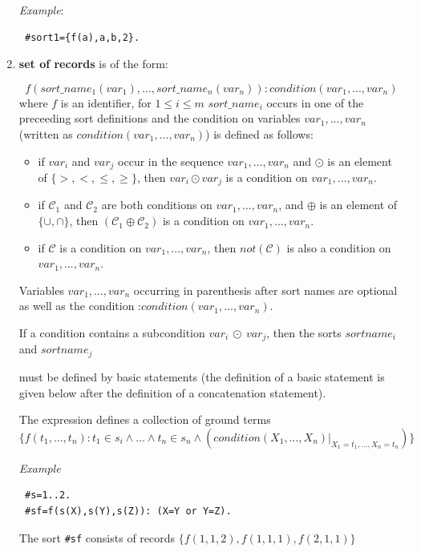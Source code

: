 \documentclass[12pt, letterpaper]{article}
\begin{document}
\begin{enumerate}
\textit{Example}: 
\begin{verbatim}
 #sort1={f(a),a,b,2}.
\end{verbatim}
\item \textbf{set of records} is of the form:

\begin{equation*}
f(sort\_name_1(var_1),..., sort\_name_n(var_n)):
                                     condition(var_1,...,var_n)
\end{equation*}
where $f$ is an identifier, for $ 1\leq i\leq m$ $sort\_name_i$ occurs in one of the preceeding sort definitions and  the condition on variables $var_1,...,var_n$ (written as $condition(var_1,...,var_n)$) is defined as follows:

\begin{itemize}
\item if $var_i$ and $var_j$ occur in the sequence  $var_1,...,var_n$ and $\odot$ is an element of $\{>,<,\le,\ge\}$, then $var_i \odot var_j$ is a condition on   $var_1,...,var_n$.
\item if $\mathcal{C}_1$ and $\mathcal{C}_2$ are both conditions on  $var_1,...,var_n$, and $\oplus$ is an element of  $\{\cup,\cap\}$, then
$(\mathcal{C}_1 \oplus \mathcal{C}_2)$ is a condition on  $var_1,...,var_n$.
\item if $\mathcal{C}$ is a  condition on  $var_1,...,var_n$, then $not(\mathcal{C})$ is also a condition on  $var_1,...,var_n$.
\end{itemize}
Variables $var_1,...,var_n$ occurring in parenthesis after sort names are optional as well as the condition :$condition(var_1,...,var_n)$.

If a condition contains a subcondition $var_i~\odot~var_j$,  then the sorts  $sortname_i$ and  $sortname_j$

must be defined by basic statements (the definition of a basic statement is given below after the definition of a concatenation statement).

The expression defines a collection of ground terms 
\\ $\{f(t_1,\dots,t_n):  t_1 \in s_i \land \dots \land t_n \in s_n \land (condition(X_1,\dots, X_n)|_{X_1 = t_1,\dots,X_n = t_n})\}$

\textit{Example}
\begin{verbatim}
 #s=1..2.
 #sf=f(s(X),s(Y),s(Z)): (X=Y or Y=Z). 
\end{verbatim}

The sort \texttt{\#sf} consists of records $\{f(1,1,2),f(1,1,1),f(2,1,1)\}$




\end{enumerate}
\end{document}
